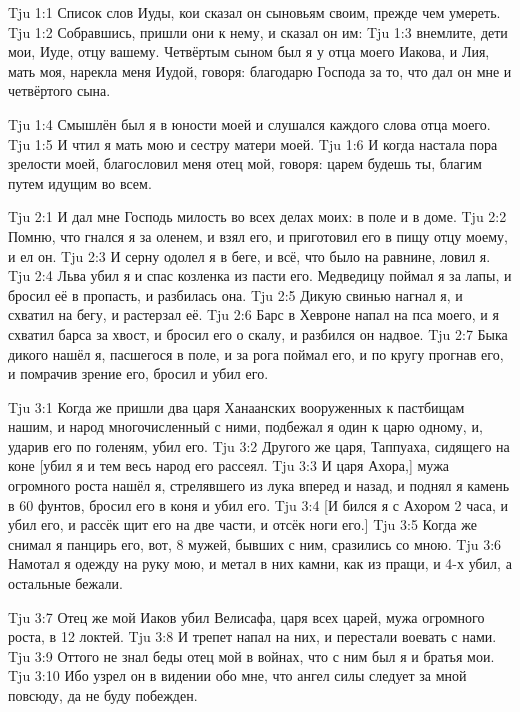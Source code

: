 \vs Tju 1:1
Список слов Иуды, кои сказал он сыновьям своим, прежде чем умереть.
\vs Tju 1:2
Собравшись, пришли они к нему, и сказал он им:
\vs Tju 1:3
внемлите, дети мои, Иуде, отцу вашему.
Четвёртым сыном был я у отца моего Иакова, и Лия,
мать моя, нарекла меня Иудой, говоря: благодарю Господа за то,
что дал он мне и четвёртого сына.

\vs Tju 1:4
Смышлён был я в юности моей и слушался каждого слова отца моего.
\vs Tju 1:5
И чтил я мать мою и сестру матери моей.
\vs Tju 1:6
И когда настала пора зрелости моей,
благословил меня отец мой, говоря:
царем будешь ты, благим путем идущим во всем.

\vs Tju 2:1
И дал мне Господь милость во всех делах моих: в поле и в доме.
\vs Tju 2:2
Помню, что гнался я за оленем, и взял его,
и приготовил его в пищу отцу моему, и ел он.
\vs Tju 2:3
И серну одолел я в беге, и всё, что было на равнине, ловил я.
\vs Tju 2:4
Льва убил я и спас козленка из пасти его.
Медведицу поймал я за лапы, и бросил её в пропасть, и разбилась она.
\vs Tju 2:5
Дикую свинью нагнал я, и схватил на бегу, и растерзал её.
\vs Tju 2:6
Барс в Хевроне напал на пса моего, и я схватил барса за хвост,
и бросил его о скалу, и разбился он надвое.
\vs Tju 2:7
Быка дикого нашёл я, пасшегося в поле, и за рога поймал его,
и по кругу прогнав его, и помрачив зрение его, бросил и убил его.

\vs Tju 3:1
Когда же пришли два царя Ханаанских вооруженных к пастбищам нашим,
и народ многочисленный с ними, подбежал я один к царю одному,
и, ударив его по голеням, убил его.
\vs Tju 3:2
Другого же царя, Таппуаха, сидящего на коне
[убил я и тем весь народ его рассеял.
\vs Tju 3:3
И царя Ахора,] мужа огромного роста нашёл я,
стрелявшего из лука вперед и назад,
и поднял я камень в 60 фунтов, бросил его в коня и убил его.
\vs Tju 3:4
[И бился я с Ахором 2 часа, и убил его, и рассёк щит его на две части,
и отсёк ноги его.]
\vs Tju 3:5
Когда же снимал я панцирь его, вот, 8 мужей, бывших с ним,
сразились со мною.
\vs Tju 3:6
Намотал я одежду на руку мою, и метал в них камни, как из пращи,
и 4-х убил, а остальные бежали.

\vs Tju 3:7
Отец же мой Иаков убил Велисафа, царя всех царей,
мужа огромного роста, в 12 локтей.
\vs Tju 3:8
И трепет напал на них, и перестали воевать с нами.
\vs Tju 3:9
Оттого не знал беды отец мой в войнах, что с ним был я и братья мои.
\vs Tju 3:10
Ибо узрел он в видении обо мне, что ангел силы следует за мной повсюду,
да не буду побежден.


